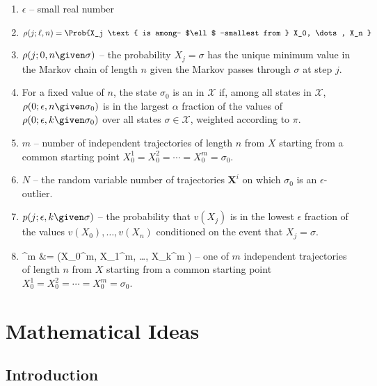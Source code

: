 \documentclass[12pt]{article}
\begin{document}
\begin{enumerate}
    \item
        \( \epsilon \) -- small real number
    \item
        \[
            \rho(j; \ell, n) = \Prob{X_j \text{ is among- $\ell$
            -smallest from } X_0, \dots, X_n }
        \]
    \item
        \( \rho(j; 0, n \given \sigma) \) -- the probability \( X_j =
        \sigma \) has the unique minimum value in the Markov chain of
        length \( n \) given the Markov passes through \( \sigma \) at
        step \( j \).
      \item     For a fixed value of \( n \), the state \( \sigma_0 \) is an  in \( \mathcal{X} \) if, among all
    states in \( \mathcal{X} \), \( \rho(0; \epsilon, n \given \sigma_{0})
    \) is in the largest \( \alpha \) fraction of the values of \( \rho(0;
    \epsilon, k \given \sigma_{0}) \) over all states \( \sigma \in
    \mathcal{X} \), weighted according to \( \pi \).
  \item \( m \) -- number of independent trajectories of length \( n \) from \(
            X \) starting from a common starting point \( X_0^1 =
            X_0^2 = \cdots = X_0^m = \sigma_0 \). 
          \item \( N \) -- the random variable
            number of trajectories \( \mathbf{X}^i \) on which \( \sigma_0
            \) is an \( \epsilon \)-outlier.
          \item \( p(j; \epsilon,k \given \sigma) \) -- the probability that
\( v(X_j) \) is in the lowest \( \epsilon \) fraction of the values \(
v(X_0), \dots, v(X_n) \) conditioned on the event that \( X_j = \sigma
\).
   \item
     ^m &= (X_0^m, X_1^m, \dots, X_k^m ) -- one of
     \( m \) independent trajectories of length \( n \) from \(
            X \) starting from a common starting point \( X_0^1 =
            X_0^2 = \cdots = X_0^m = \sigma_0 \). 
\end{enumerate}
\section*{Mathematical Ideas}

\subsection*{Introduction}
\end{document}

